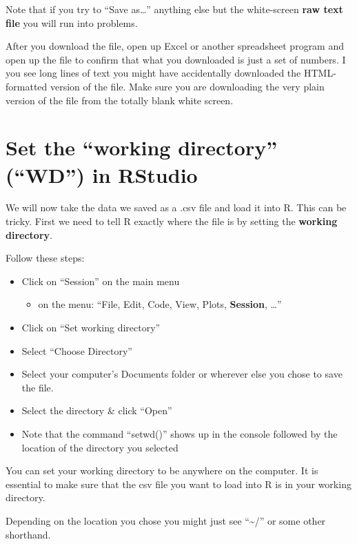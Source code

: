 \documentclass[]{book}
\providecommand{\tightlist}{%
  \setlength{\itemsep}{0pt}\setlength{\parskip}{0pt}}
\theoremstyle{definition}
\theoremstyle{definition}
\theoremstyle{definition}
\theoremstyle{remark}
\begin{document}
Note that if you try to ``Save as\ldots{}'' anything else but the
white-screen \textbf{raw text file} you will run into problems.

After you download the file, open up Excel or another spreadsheet
program and open up the file to confirm that what you downloaded is just
a set of numbers. I you see long lines of text you might have
accidentally downloaded the HTML-formatted version of the file. Make
sure you are downloading the very plain version of the file from the
totally blank white screen.

\section{\texorpdfstring{Set the ``working directory'' (``WD'') in
RStudio}{Set the working directory (WD) in RStudio}}\label{set-the-working-directory-wd-in-rstudio}

We will now take the data we saved as a .csv file and load it into R.
This can be tricky. First we need to tell R exactly where the file is by
setting the \textbf{working directory}.

Follow these steps:

\begin{itemize}
\tightlist
\item
  Click on ``Session'' on the main menu

  \begin{itemize}
  \tightlist
  \item
    on the menu: ``File, Edit, Code, View, Plots, \textbf{Session},
    \ldots{}''
  \end{itemize}
\item
  Click on ``Set working directory''
\item
  Select ``Choose Directory''
\item
  Select your computer's Documents folder or wherever else you chose to
  save the file.
\item
  Select the directory \& click ``Open''
\item
  Note that the command ``setwd()'' shows up in the console followed by
  the location of the directory you selected
\end{itemize}

You can set your working directory to be anywhere on the computer. It is
essential to make sure that the csv file you want to load into R is in
your working directory.

Depending on the location you chose you might just see
``\textasciitilde{}/'' or some other shorthand.
\end{document}
